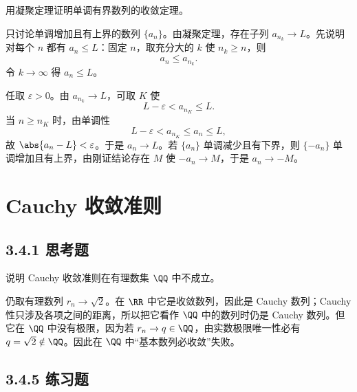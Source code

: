 \begin{xexercise}[3.3.3 练习题 4]
用凝聚定理证明单调有界数列的收敛定理。
\end{xexercise}
\begin{xsolution}
只讨论单调增加且有上界的数列 $\{a_n\}$。由凝聚定理，存在子列 $a_{n_k}\to L$。先说明对每个 $n$ 都有 $a_n\leqslant L$：固定 $n$，取充分大的 $k$ 使 $n_k\geqslant n$，则
\[
  a_n\leqslant a_{n_k}.
\]
令 $k\to\infty$ 得 $a_n\leqslant L$。

任取 $\varepsilon>0$。由 $a_{n_k}\to L$，可取 $K$ 使
\[
  L-\varepsilon<a_{n_K}\leqslant L.
\]
当 $n\geqslant n_K$ 时，由单调性
\[
  L-\varepsilon<a_{n_K}\leqslant a_n\leqslant L,
\]
故 $\abs{a_n-L}<\varepsilon$。于是 $a_n\to L$。若 $\{a_n\}$ 单调减少且有下界，则 $\{-a_n\}$ 单调增加且有上界，由刚证结论存在 $M$ 使 $-a_n\to M$，于是 $a_n\to-M$。
\end{xsolution}

\section{Cauchy 收敛准则}
\subsection*{3.4.1 思考题}

\begin{xthought}[3.4.1 思考题]
说明 Cauchy 收敛准则在有理数集 $\QQ$ 中不成立。
\end{xthought}
\begin{xsolution}
仍取有理数列 $r_n\to\sqrt2$。在 $\RR$ 中它是收敛数列，因此是 Cauchy 数列；Cauchy 性只涉及各项之间的距离，所以把它看作 $\QQ$ 中的数列时仍是 Cauchy 数列。但它在 $\QQ$ 中没有极限，因为若 $r_n\to q\in\QQ$，由实数极限唯一性必有 $q=\sqrt2\notin\QQ$。因此在 $\QQ$ 中“基本数列必收敛”失败。
\end{xsolution}

\subsection*{3.4.5 练习题}

